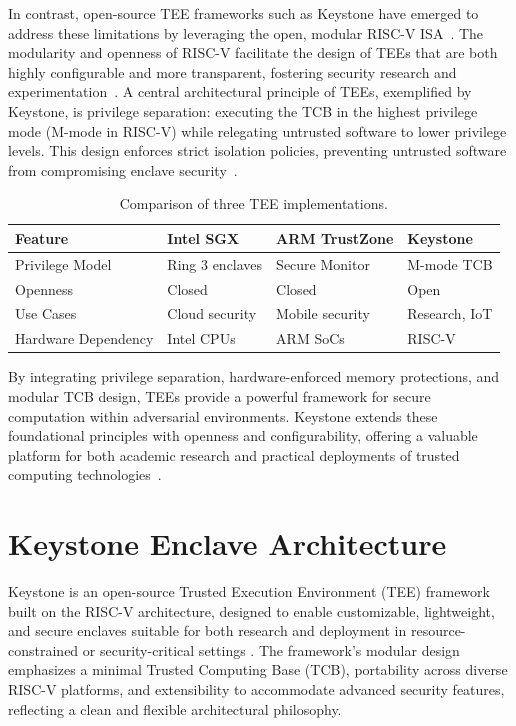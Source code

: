 In contrast, open-source TEE frameworks such as Keystone have emerged to address these limitations by leveraging the open, modular RISC-V ISA~\cite{lee2019keystone,dayeol2019keystone}. The modularity and openness of RISC-V facilitate the design of TEEs that are both highly configurable and more transparent, fostering security research and experimentation~\cite{Survey2023}. A central architectural principle of TEEs, exemplified by Keystone, is privilege separation: executing the TCB in the highest privilege mode (M-mode in RISC-V) while relegating untrusted software to lower privilege levels. This design enforces strict isolation policies, preventing untrusted software from compromising enclave security~\cite{lee2019keystone}.


\begin{table}[htbp]
\centering
\small
\begin{tabular}{@{}p{3cm}p{2.5cm}p{2.5cm}p{2.5cm}@{}}
\toprule
\textbf{Feature} & \textbf{Intel SGX} & \textbf{ARM TrustZone} & \textbf{Keystone} \\
\midrule
Privilege Model & Ring 3 enclaves & Secure Monitor & M-mode TCB \\
Openness & Closed & Closed & Open \\
Use Cases & Cloud security & Mobile security & Research, IoT \\
Hardware Dependency & Intel CPUs & ARM SoCs & RISC-V \\
\bottomrule
\end{tabular}
\caption{Comparison of three TEE implementations.}
\end{table}


By integrating privilege separation, hardware-enforced memory protections, and modular TCB design, TEEs provide a powerful framework for secure computation within adversarial environments. Keystone extends these foundational principles with openness and configurability, offering a valuable platform for both academic research and practical deployments of trusted computing technologies~\cite{suzaki2021tsperf}.


\section{Keystone Enclave Architecture}

Keystone is an open-source Trusted Execution Environment (TEE) framework built on the RISC-V architecture, designed to enable customizable, lightweight, and secure enclaves suitable for both research and deployment in resource-constrained or security-critical settings \cite{dayeol2019keystone}. The framework’s modular design emphasizes a minimal Trusted Computing Base (TCB), portability across diverse RISC-V platforms, and extensibility to accommodate advanced security features, reflecting a clean and flexible architectural philosophy.

